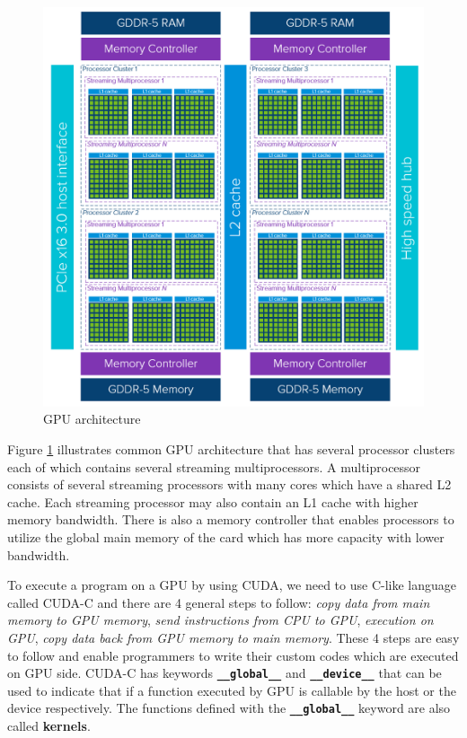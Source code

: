 \documentclass[conference]{IEEEtran}
\begin{document}
\begin{figure}[h]
	\centering
	\includegraphics[width=0.75\linewidth]{img/gpu-architecture.png}
	\caption{GPU architecture}
	\label{fig:gpu_arch}
\end{figure}

Figure \ref{fig:gpu_arch} \cite{b1} illustrates common GPU architecture that has several processor clusters each of which contains several 
streaming multiprocessors. A multiprocessor consists of several streaming processors with many cores which have a shared L2 cache. Each streaming processor may also contain an L1 cache with higher 
memory bandwidth. There is also a memory controller that enables processors to utilize the global main memory of the card which has more capacity with lower bandwidth.

To execute a program on a GPU by using CUDA, we need to use C-like language called CUDA-C and there are 4 general steps to follow: \textit{copy data from main memory to GPU memory}, 
\textit{send instructions from CPU to GPU}, \textit{execution on GPU}, \textit{copy data back from GPU memory to main memory}. These 4 steps are easy to follow and enable programmers 
to write their custom codes which are executed on GPU side. CUDA-C has keywords \textbf{\lstinline{__global__}} and \textbf{\lstinline{__device__}} that can be used to indicate that 
if a function executed by GPU is callable by the host or the device respectively. The functions defined with the \textbf{\lstinline{__global__}} keyword are also called \textbf{kernels}.
\end{document}
